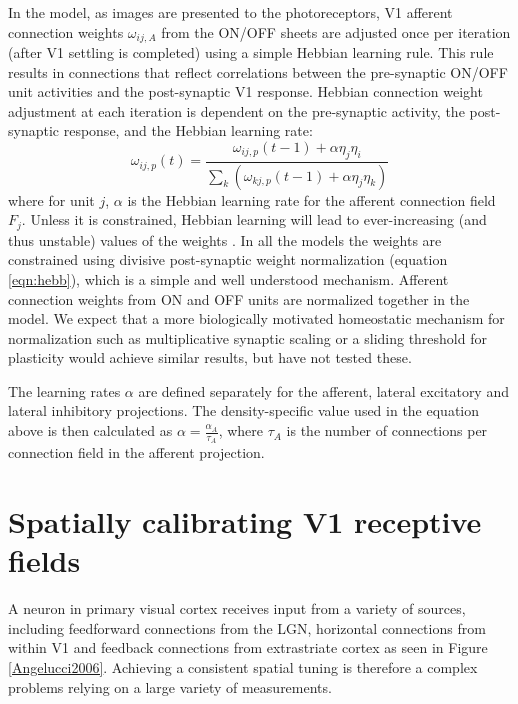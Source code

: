 In the model, as images are presented to the photoreceptors, V1
afferent connection weights $\omega_{ij,A}$ from the ON/OFF sheets are
adjusted once per iteration (after V1 settling is completed) using a
simple Hebbian learning rule. This rule results in connections that
reflect correlations between the pre-synaptic ON/OFF unit activities
and the post-synaptic V1 response.  Hebbian connection weight
adjustment at each iteration is dependent on the pre-synaptic
activity, the post-synaptic response, and the Hebbian learning rate:
\begin{equation}
\omega_{ij,p}(t)=\frac{\omega_{ij,p}(t-1)+\alpha\eta_{j}\eta_{i}}{\sum_{k}\left(\omega_{kj,p}(t-1)+\alpha\eta_{j}\eta_{k}\right)}
\label{eqn:hebb}
\end{equation}
where for unit $j$, $\alpha$ is the Hebbian learning rate for the
afferent connection field $F_{j}$. Unless it is constrained, Hebbian
learning will lead to ever-increasing (and thus unstable) values of
the weights \citep{Rochester1956}. In all the models the weights are
constrained using divisive post-synaptic weight normalization
(equation \ref{eqn:hebb}), which is a simple and well understood
mechanism. Afferent connection weights from ON and OFF units are
normalized together in the model. We expect that a more
biologically motivated
homeostatic mechanism for normalization such as multiplicative
synaptic scaling \citep{Turrigiano1999,Turrigiano2004,Sullivan2006}
or a sliding threshold for plasticity \citep{Bienenstock1982}
would achieve similar results, but have not tested these.

The learning rates $\alpha$ are defined separately for the afferent,
lateral excitatory and lateral inhibitory projections.  The
density-specific value used in the equation above is then calculated
as $\alpha=\frac{\alpha_{A}}{\tau_{A}}$, where $\tau_{A}$ is the
number of connections per connection field in the afferent projection.

\section{Spatially calibrating V1 receptive fields}

A neuron in primary visual cortex receives input from a variety of
sources, including feedforward connections from the LGN, horizontal
connections from within V1 and feedback connections from extrastriate
cortex as seen in Figure \ref{Angelucci2006}. Achieving a consistent
spatial tuning is therefore a complex problems relying on a large
variety of measurements.

